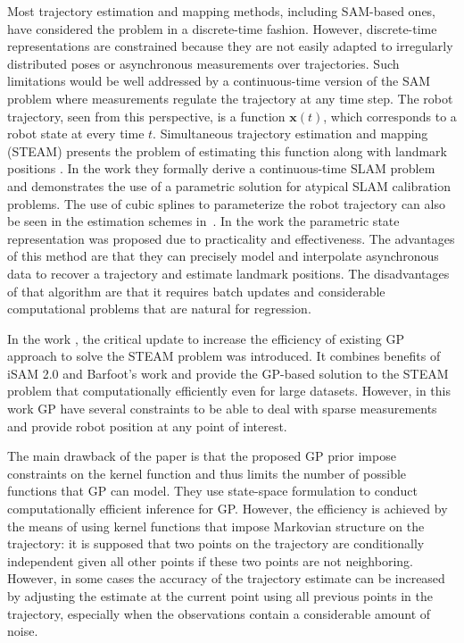 Most trajectory estimation and mapping methods, including SAM-based ones, have considered the problem in a
discrete-time fashion.
However, discrete-time representations are constrained because they are not easily adapted to irregularly distributed poses or asynchronous measurements over trajectories.
Such limitations would be well addressed by a continuous-time version of the SAM problem where measurements regulate the trajectory at any time step.
The robot trajectory, seen from this perspective, is a function $\bm{x}(t)$,
which corresponds to a robot state at every time $t$. Simultaneous trajectory estimation and mapping (STEAM) presents the problem of estimating this function along with landmark positions \cite{barfoot,barfoot2017}.
In the work \cite{furgal} they formally derive a
continuous-time SLAM problem and demonstrates the use of a parametric solution for atypical SLAM
calibration problems.
The use of cubic splines to parameterize the robot trajectory can also be seen in the estimation schemes
in~\cite{br, fleps, droeschel2018efficient}.
In the work \cite{tong2013gaussian} the  parametric
state  representation  was proposed due  to
practicality and effectiveness.
The advantages of this method are that they can
precisely model  and  interpolate  asynchronous
data to  recover  a  trajectory  and  estimate
landmark positions.
The disadvantages of that algorithm are that it
requires batch updates and considerable
computational  problems that are natural for
regression.


In  the  work \cite{best}, the  critical  update  to
increase the efficiency of  existing  GP approach to
solve the  STEAM  problem was introduced.
It combines benefits of iSAM  2.0 and Barfoot's work \cite{barfoot2014batch}
and provide the GP-based  solution  to the  STEAM
problem  that  computationally  efficiently even for
large datasets.
However, in this work GP have several constraints to
be able to deal with sparse measurements and provide
robot position at any point of interest.

The main drawback of the paper is that the proposed GP
prior impose constraints on the kernel function and
thus limits the number of possible functions that GP
can model.
They use state-space formulation to conduct
computationally efficient inference for GP.
However, the efficiency is achieved by the means of
using kernel functions that impose Markovian structure on the trajectory:
it is supposed that two points on the trajectory are conditionally
independent given all other points if these two points are not neighboring.
However, in some cases the accuracy of the trajectory
estimate can be increased by adjusting the estimate
at the current point using all previous points in the trajectory, especially when the observations
contain a considerable amount of noise.

